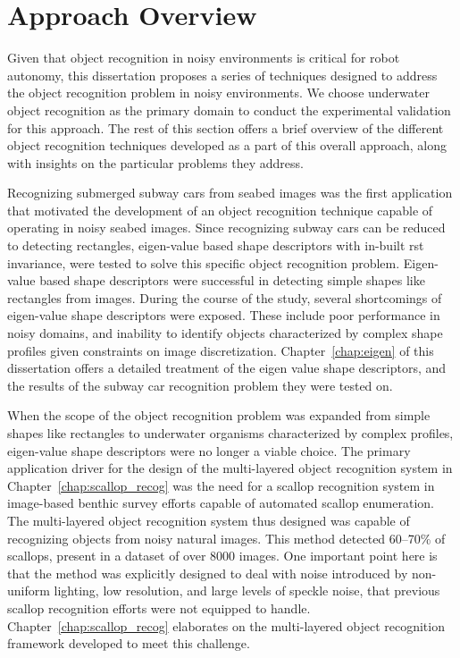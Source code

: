 \documentclass {udthesis}
\begin{document}
\section{Approach Overview}

Given that object recognition in noisy environments is critical for robot autonomy, this dissertation proposes a series of techniques designed to address the object recognition problem in noisy environments.
We choose
underwater object recognition as the primary domain to conduct the experimental validation for this approach.
The rest of this section offers a brief overview of the different object recognition techniques developed as a part of this overall approach, along with insights on the particular problems they address.

Recognizing submerged subway cars from seabed images was the first application that motivated the development of an object recognition technique capable of operating in noisy seabed images. Since recognizing subway cars can be reduced 
to detecting rectangles, eigen-value based shape descriptors with in-built \gls{rst} invariance, were tested
to solve this specific object recognition problem. Eigen-value based shape descriptors were successful in detecting 
simple shapes like rectangles from images.
During the course of the study, several shortcomings of eigen-value shape descriptors were exposed. These include poor performance in noisy domains, and inability to identify objects characterized by complex shape profiles given constraints on image discretization. Chapter~\ref{chap:eigen} of this dissertation offers a detailed treatment of the eigen value shape descriptors, and the results of the subway car recognition problem they were tested on.

When the scope of the object recognition problem was expanded from simple shapes like rectangles to underwater organisms characterized by complex profiles,
eigen-value shape descriptors were no longer a viable choice. The primary application driver for the design of the multi-layered object recognition system in Chapter~\ref{chap:scallop_recog} was the need for a 
scallop recognition system in image-based benthic survey efforts capable of automated scallop enumeration. 
The multi-layered object recognition system thus designed was capable of recognizing objects from noisy natural images. This method detected 60--70\% of scallops, present in a dataset of over 8000 images. One important point here is that the method was explicitly designed to deal with noise introduced by non-uniform lighting, low resolution, and large levels of speckle noise, that previous scallop recognition efforts were not equipped to handle. Chapter~\ref{chap:scallop_recog} elaborates on the multi-layered object recognition framework developed to meet this challenge.
\end{document}
